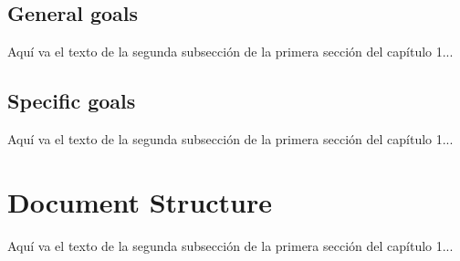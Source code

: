 \documentclass{iccmemoria}
\begin{document}
\subsection{General goals}
Aquí va el texto de la segunda subsección de la primera sección del capítulo 1...

\subsection{Specific goals}
Aquí va el texto de la segunda subsección de la primera sección del capítulo 1...

\section{Document Structure}
Aquí va el texto de la segunda subsección de la primera sección del capítulo 1...








\end{document}
